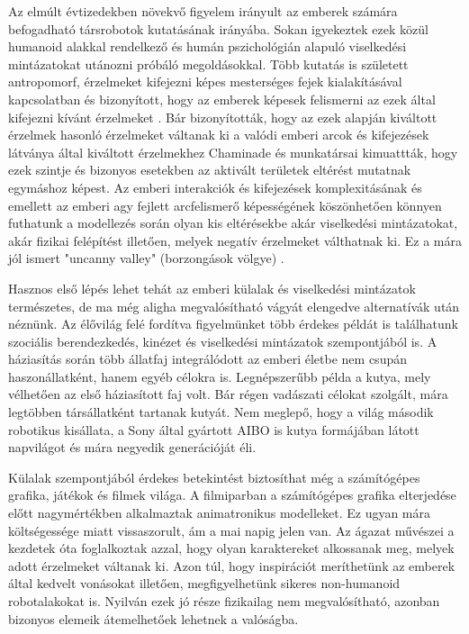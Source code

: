 Az elmúlt évtizedekben növekvő figyelem irányult az emberek számára befogadható társrobotok kutatásának irányába. Sokan igyekeztek ezek közül humanoid alakkal rendelkező és humán pszichológián alapuló viselkedési mintázatokat utánozni próbáló megoldásokkal. Több kutatás is született antropomorf, érzelmeket kifejezni képes mesterséges fejek kialakításával kapcsolatban és bizonyított, hogy az emberek képesek felismerni az ezek által kifejezni kívánt érzelmeket \cite{lutkebohle_bielefeld_2010} \cite{delaunay_towards_2009} \cite{nitsch_emotions_2014}. Bár bizonyították, hogy az ezek alapján kiváltott érzelmek hasonló érzelmeket váltanak ki a valódi emberi arcok és kifejezések látványa által kiváltott érzelmekhez Chaminade és munkatársai \cite{chaminade_brain_2010} kimuattták, hogy ezek szintje és bizonyos esetekben az aktivált területek eltérést mutatnak egymáshoz képest. Az emberi interakciók és kifejezések komplexitásának és emellett az emberi agy fejlett arcfelismerő képességének köszönhetően könnyen futhatunk a modellezés során olyan kis eltérésekbe akár viselkedési mintázatokat, akár fizikai felépítést illetően, melyek negatív érzelmeket válthatnak ki. Ez a mára jól ismert "uncanny valley" (borzongások völgye) \cite{mori_bukimi_1970}.

Hasznos első lépés lehet tehát az emberi külalak és viselkedési mintázatok természetes, de ma még aligha megvalósítható vágyát elengedve alternatívák után néznünk. Az élővilág felé fordítva figyelmünket több érdekes példát is találhatunk szociális berendezkedés, kinézet és viselkedési mintázatok szempontjából is. A háziasítás során több állatfaj integrálódott az emberi életbe nem csupán haszonállatként, hanem egyéb célokra is. Legnépszerűbb példa a kutya, mely vélhetően az első háziasított faj volt. Bár régen vadászati célokat szolgált, mára legtöbben társállatként tartanak kutyát. Nem meglepő, hogy a világ második robotikus kisállata, a Sony által gyártott AIBO is kutya formájában látott napvilágot és mára negyedik generációját éli.

Külalak szempontjából érdekes betekintést biztosíthat még a számítógépes grafika, játékok és filmek világa. A filmiparban a számítógépes grafika elterjedése előtt nagymértékben alkalmaztak animatronikus modelleket. Ez ugyan mára költségessége miatt vissaszorult, ám a mai napig jelen van. Az ágazat művészei a kezdetek óta foglalkoztak azzal, hogy olyan karaktereket alkossanak meg, melyek adott érzelmeket váltanak ki. Azon túl, hogy inspirációt meríthetünk az emberek által kedvelt vonásokat illetően, megfigyelhetünk sikeres non-humanoid robotalakokat is. Nyilván ezek jó része fizikailag nem megvalósítható, azonban bizonyos elemeik átemelhetőek lehetnek a valóságba.

